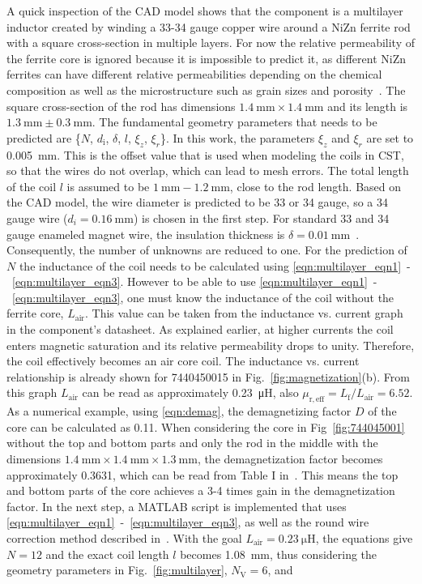 A quick inspection of the CAD model shows that the component is a multilayer inductor created by winding a 33-34 gauge copper wire around a NiZn ferrite rod with a square cross-section in multiple layers. For now the relative permeability of the ferrite core is ignored because it is impossible to predict it, as different NiZn ferrites can have different relative permeabilities depending on the chemical composition as well as the microstructure such as grain sizes and porosity~\cite{wijn}. The square cross-section of the rod has dimensions $\SI{1.4}{\milli\meter}\times\SI{1.4}{\milli\meter}$ and its length is $\SI{1.3}{\milli\meter}\pm\SI{0.3}{\milli\meter}$. The fundamental geometry parameters that needs to be predicted are \{$N$, $d_\mathrm{i}$, $\delta$, $l$, $\xi_z$, $\xi_r$\}. In this work, the parameters $\xi_z$ and $\xi_r$ are set to \SI{0.005}{\milli\meter}. This is the offset value that is used when modeling the coils in CST, so that the wires do not overlap, which can lead to mesh errors. The total length of the coil $l$ is assumed to be $\SI{1}{\milli\meter} - \SI{1.2}{\milli\meter}$, close to the rod length. Based on the CAD model, the wire diameter is predicted to be 33 or 34 gauge, so a 34 gauge wire ($d_i = \SI{0.16}{\milli\meter}$) is chosen in the first step. For standard 33 and 34 gauge enameled magnet wire, the insulation thickness is $\delta = \SI{0.01}{\milli\meter}$~\cite{electronbunker}. Consequently, the number of unknowns are reduced to one. For the prediction of $N$ the inductance of the coil needs to be calculated using \eqref{eqn:multilayer_eqn1}~-~\eqref{eqn:multilayer_eqn3}. However to be able to use \eqref{eqn:multilayer_eqn1}~-~\eqref{eqn:multilayer_eqn3}, one must know the inductance of the coil without the ferrite core, $L_\mathrm{air}$. This value can be taken from the inductance vs. current graph in the component's datasheet. As explained earlier, at higher currents the coil enters magnetic saturation and its relative permeability drops to unity. Therefore, the coil effectively becomes an air core coil. The inductance vs. current relationship is already shown for 7440450015 in Fig.~\ref{fig:magnetization}(b). From this graph $L_{\mathrm{air}}$ can be read as approximately \SI{0.23}{\micro\henry}, also $\mu_{\mathrm{r,eff}} = L_{\mathrm{f}}/L_{\mathrm{air}} = 6.52$. As a numerical example, using \eqref{eqn:demag}, the demagnetizing factor $D$ of the core can be calculated as 0.11. When considering the core in Fig~\ref{fig:744045001} without the top and bottom parts and only the rod in the middle with the dimensions $\SI{1.4}{\milli\meter}\times\SI{1.4}{\milli\meter}\times\SI{1.3}{\milli\meter}$, the demagnetization factor becomes approximately 0.3631, which can be read from Table I in~\cite{moskowitz}. This means the top and bottom parts of the core achieves a 3-4 times gain in the demagnetization factor. In the next step, a MATLAB script is implemented that uses \eqref{eqn:multilayer_eqn1}~-~\eqref{eqn:multilayer_eqn3}, as well as the round wire correction method described in~\cite{cheng}. With the goal $L_\mathrm{air} = \SI{0.23}{\micro\henry}$, the equations give $N = 12$ and the exact coil length $l$ becomes \SI{1.08}{\milli\meter}, thus considering the geometry parameters in Fig.~\ref{fig:multilayer}, $N_\mathrm{V} = 6$, and 